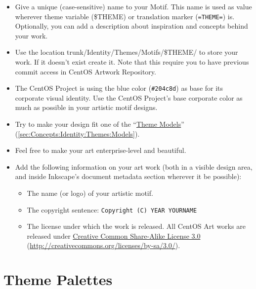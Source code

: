 \begin{itemize}

\item Give a unique (case-sensitive) name to your Motif. This name is
used as value wherever theme variable (\$THEME) or translation marker
(\texttt{=THEME=}) is.  Optionally, you can add a description about
inspiration and concepts behind your work.

\item Use the location trunk/Identity/Themes/Motifs/\$THEME/ to store
your work. If it doesn't exist create it. Note that this require you
to have previous commit access in CentOS Artwork Repository.

\item The CentOS Project is using the blue color (\texttt{\#204c8d})
as base for its corporate visual identity. Use the CentOS Project's
base corporate color as much as possible in your artistic motif
designs.

\item Try to make your design fit one of the
``\hyperlink{sec:Concepts:Identity:Themes:Models}{Theme Models}''
(\autoref{sec:Concepts:Identity:Themes:Models}).

\item Feel free to make your art enterprise-level and beautiful.

\item Add the following information on your art work (both in a visible
design area, and inside Inkscape's document metadata section wherever
it be possible):

\begin{itemize}

\item The name (or logo) of your artistic motif.

\item The copyright sentence: \texttt{Copyright (C) YEAR YOURNAME}

\item The license under which the work is released. All CentOS Art
works are released under
\href{http://creativecommons.org/licenses/by-sa/3.0/}{Creative Common
Share-Alike License 3.0}
(\href{http://creativecommons.org/licenses/by-sa/3.0/}{http://creativecommons.org/licenses/by-sa/3.0/}).

\end{itemize}

\end{itemize}
\section{Theme Palettes}
\hypertarget{sec:Concepts:Identity:Themes:Palettes}{}
\label{sec:Concepts:Identity:Themes:Palettes}

